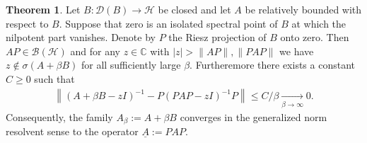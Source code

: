 \documentclass[reqno,12pt,letterpaper]{amsart}
\numberwithin{equation}{section}
\newcommand{\1}{\mathds{1}}
\theoremstyle{definition}
\newtheorem{Thm}[Th]{Theorem}
\begin{document}
\begin{Thm}\label{bounded_setting}
	Let $B: \mathcal{D}(B) \rightarrow \mathcal{H}$ be closed and let $A$ be relatively bounded with respect to $B$. Suppose that zero is an isolated spectral point of \( B \) at which the nilpotent part vanishes. Denote by \( P \) the Riesz projection of \( B \) onto zero. Then $AP \in \mathcal{B}(\mathcal{H})$ and  for any \( z \in \mathbb{C} \) with $
	|z| > \|A P\|, \| P A P\|
	$
	we have \( z \notin \sigma(A + \beta B) \) for all sufficiently large \(\beta\).  Furtheremore there exists a constant \( C\geq 0 \)  such that
	\begin{align}\label{rel_bdd_conv_est}
		\left\| (A + \beta B - z I)^{-1} - P (P A P - z I)^{-1} P \right\| \leq C/\beta \xrightarrow[\beta \to \infty]{} 0.
	\end{align}
	Consequently, the family \( A_\beta := A + \beta B \) converges in the generalized norm resolvent sense to the operator \(\underline{A} := P A P\). 
\end{Thm}
\end{document}
